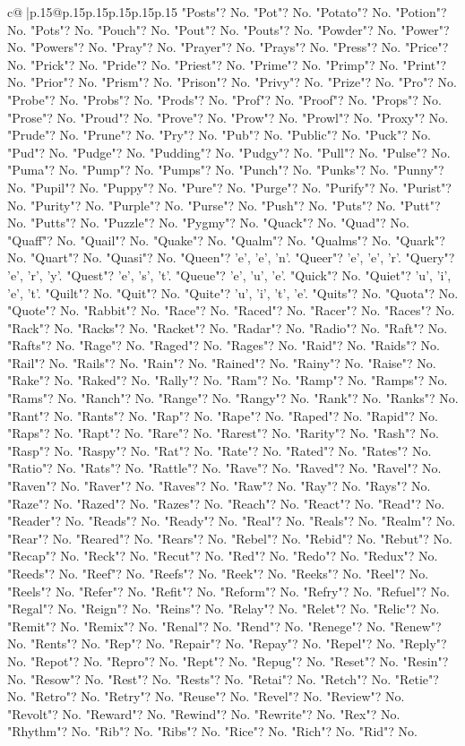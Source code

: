 \documentclass{article}
\begin{document}
{\begin{supertabular}{c@{$\;$}|p{.15\linewidth}@{}p{.15\linewidth}p{.15\linewidth}p{.15\linewidth}p{.15\linewidth}p{.15\linewidth}}
{{{"Posts"? No. "Pot"? No. "Potato"? No. "Potion"? No. "Pots"? No. "Pouch"? No. "Pout"? No. "Pouts"? No. "Powder"? No. "Power"? No. "Powers"? No. "Pray"? No. "Prayer"? No. "Prays"? No. "Press"? No. "Price"? No. "Prick"? No. "Pride"? No. "Priest"? No. "Prime"? No. "Primp"? No. "Print"? No. "Prior"? No. "Prism"? No. "Prison"? No. "Privy"? No. "Prize"? No. "Pro"? No. "Probe"? No. "Probs"? No. "Prods"? No. "Prof"? No. "Proof"? No. "Props"? No. "Prose"? No. "Proud"? No. "Prove"? No. "Prow"? No. "Prowl"? No. "Proxy"? No. "Prude"? No. "Prune"? No. "Pry"? No. "Pub"? No. "Public"? No. "Puck"? No. "Pud"? No. "Pudge"? No. "Pudding"? No. "Pudgy"? No. "Pull"? No. "Pulse"? No. "Puma"? No. "Pump"? No. "Pumps"? No. "Punch"? No. "Punks"? No. "Punny"? No. "Pupil"? No. "Puppy"? No. "Pure"? No. "Purge"? No. "Purify"? No. "Purist"? No. "Purity"? No. "Purple"? No. "Purse"? No. "Push"? No. "Puts"? No. "Putt"? No. "Putts"? No. "Puzzle"? No. "Pygmy"? No. "Quack"? No. "Quad"? No. "Quaff"? No. "Quail"? No. "Quake"? No. "Qualm"? No. "Qualms"? No. "Quark"? No. "Quart"? No. "Quasi"? No. "Queen"? 'e', 'e', 'n'. "Queer"? 'e', 'e', 'r'. "Query"? 'e', 'r', 'y'. "Quest"? 'e', 's', 't'. "Queue"? 'e', 'u', 'e'. "Quick"? No. "Quiet"? 'u', 'i', 'e', 't'. "Quilt"? No. "Quit"? No. "Quite"? 'u', 'i', 't', 'e'. "Quits"? No. "Quota"? No. "Quote"? No. "Rabbit"? No. "Race"? No. "Raced"? No. "Racer"? No. "Races"? No. "Rack"? No. "Racks"? No. "Racket"? No. "Radar"? No. "Radio"? No. "Raft"? No. "Rafts"? No. "Rage"? No. "Raged"? No. "Rages"? No. "Raid"? No. "Raids"? No. "Rail"? No. "Rails"? No. "Rain"? No. "Rained"? No. "Rainy"? No. "Raise"? No. "Rake"? No. "Raked"? No. "Rally"? No. "Ram"? No. "Ramp"? No. "Ramps"? No. "Rams"? No. "Ranch"? No. "Range"? No. "Rangy"? No. "Rank"? No. "Ranks"? No. "Rant"? No. "Rants"? No. "Rap"? No. "Rape"? No. "Raped"? No. "Rapid"? No. "Raps"? No. "Rapt"? No. "Rare"? No. "Rarest"? No. "Rarity"? No. "Rash"? No. "Rasp"? No. "Raspy"? No. "Rat"? No. "Rate"? No. "Rated"? No. "Rates"? No. "Ratio"? No. "Rats"? No. "Rattle"? No. "Rave"? No. "Raved"? No. "Ravel"? No. "Raven"? No. "Raver"? No. "Raves"? No. "Raw"? No. "Ray"? No. "Rays"? No. "Raze"? No. "Razed"? No. "Razes"? No. "Reach"? No. "React"? No. "Read"? No. "Reader"? No. "Reads"? No. "Ready"? No. "Real"? No. "Reals"? No. "Realm"? No. "Rear"? No. "Reared"? No. "Rears"? No. "Rebel"? No. "Rebid"? No. "Rebut"? No. "Recap"? No. "Reck"? No. "Recut"? No. "Red"? No. "Redo"? No. "Redux"? No. "Reeds"? No. "Reef"? No. "Reefs"? No. "Reek"? No. "Reeks"? No. "Reel"? No. "Reels"? No. "Refer"? No. "Refit"? No. "Reform"? No. "Refry"? No. "Refuel"? No. "Regal"? No. "Reign"? No. "Reins"? No. "Relay"? No. "Relet"? No. "Relic"? No. "Remit"? No. "Remix"? No. "Renal"? No. "Rend"? No. "Renege"? No. "Renew"? No. "Rents"? No. "Rep"? No. "Repair"? No. "Repay"? No. "Repel"? No. "Reply"? No. "Repot"? No. "Repro"? No. "Rept"? No. "Repug"? No. "Reset"? No. "Resin"? No. "Resow"? No. "Rest"? No. "Rests"? No. "Retai"? No. "Retch"? No. "Retie"? No. "Retro"? No. "Retry"? No. "Reuse"? No. "Revel"? No. "Review"? No. "Revolt"? No. "Reward"? No. "Rewind"? No. "Rewrite"? No. "Rex"? No. "Rhythm"? No. "Rib"? No. "Ribs"? No. "Rice"? No. "Rich"? No. "Rid"? No. }}}
\end{supertabular}}
\end{document}
